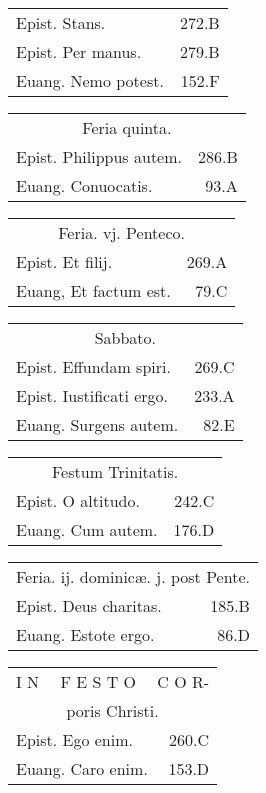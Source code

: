 \documentclass[a5paper,10pt]{book}
\def\ae{æ}
\begin{document}
\begin{multicols}{2}
\begin{tabular}{l r}
Epist. Stans. & 272.B\\
Epist. Per manus. & 279.B\\
Euang. Nemo potest. & 152.F\\
\end{tabular}
\begin{tabular}{l r}
\multicolumn{2}{c}{\color{red} Feria quinta.}\\
Epist. Philippus autem. & 286.B\\
Euang. Conuocatis. & 93.A\\
\end{tabular}
\begin{tabular}{l r}
\multicolumn{2}{c}{\color{red} Feria. vj. Penteco.}\\
Epist. Et filij. & 269.A\\
Euang, Et factum est. & 79.C\\%
\end{tabular}
\begin{tabular}{l r}
\multicolumn{2}{c}{\color{red} Sabbato.}\\
Epist. Effundam spiri. & 269.C\\
Epist. Iustificati ergo. & 233.A\\
Euang. Surgens autem. & 82.E\\
\end{tabular}
\begin{tabular}{l r}
\multicolumn{2}{c}{\color{red} Festum Trinitatis.}\\
Epist. O altitudo. & 242.C\\
Euang. Cum autem. & 176.D\\
\end{tabular}
\begin{tabular}{l r}
\multicolumn{2}{c}{\color{red} Feria. ij. dominic\ae . j. post Pente.}\\
Epist. Deus charitas. & 185.B\\
Euang. Estote ergo. & 86.D\\
\end{tabular}
\begin{tabular}{l r}
\multicolumn{2}{c}{\color{red} \large I N \ \ F E S T O \ \ C O R-}\\
\multicolumn{2}{c}{\color{red} poris Christi.}\\
Epist. Ego enim. & 260.C\\
Euang. Caro enim. & 153.D\\%
\end{tabular}
\begin{tabular}{l r}

\end{tabular}
\end{multicols}
\end{document}
